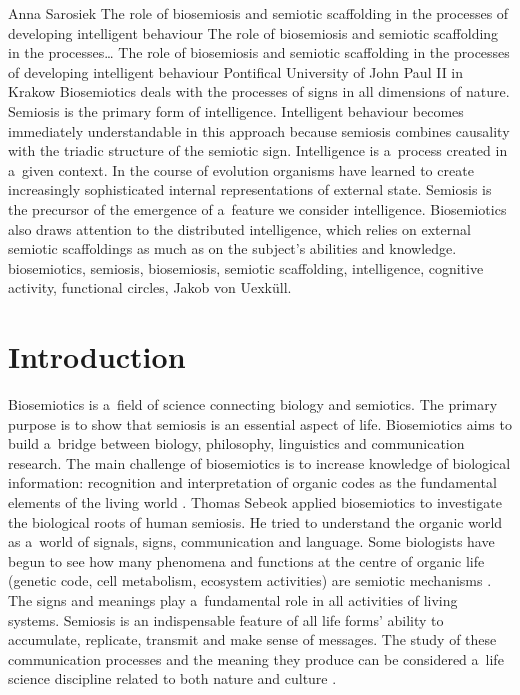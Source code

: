 \begin{artengenv}{Anna Sarosiek}
	{The role of biosemiosis and semiotic scaffolding in the processes of developing intelligent behaviour}
	{The role of biosemiosis and semiotic scaffolding in the processes\ldots}
	{The role of biosemiosis and semiotic scaffolding in the processes\\
	of developing intelligent behaviour}
	{Pontifical University of John Paul II in Krakow\label{sarosiek_anfang}}
	{Biosemiotics deals with the processes of signs in all dimensions of nature. Semiosis is the primary form of intelligence. Intelligent behaviour becomes immediately understandable in this approach because semiosis combines causality with the triadic structure of the semiotic sign. Intelligence is a~process created in a~given context. In the course of evolution organisms have learned to create increasingly sophisticated internal representations of external state. Semiosis is the precursor of the emergence of a~feature we consider intelligence. Biosemiotics also draws attention to the distributed intelligence, which relies on external semiotic scaffoldings as much as on the subject’s abilities and knowledge.}
	{biosemiotics, semiosis, biosemiosis, semiotic scaffolding, intelligence, cognitive activity, functional circles, Jakob von Uexküll.}





\section*{Introduction }
Biosemiotics is a~field of science connecting biology and semiotics. The primary purpose is to show that semiosis is an essential aspect of life. Biosemiotics aims to build a~bridge between biology, philosophy, linguistics and communication research. The main challenge of biosemiotics is to increase knowledge of biological information: recognition and interpretation of organic codes as the fundamental elements of the living world
\parencite[][]{barbieri_life_2005}. %
 Thomas Sebeok applied biosemiotics to investigate the biological roots of human semiosis. He tried to understand the organic world as a~world of signals, signs, communication and language. Some biologists have begun to see how many phenomena and functions at the centre of organic life (genetic code, cell metabolism, ecosystem activities) are semiotic mechanisms 
\parencite[][]{anderson_semiotic_1984}. %
 The signs and meanings play a~fundamental role in all activities of living systems. Semiosis is an indispensable feature of all life forms’ ability to accumulate, replicate, transmit and make sense of messages. The study of these communication processes and the meaning they produce can be considered a~life science discipline related to both nature and culture 
\parencite[][p.22]{sebeok_semiotic_1991}.%



\end{artengenv}
